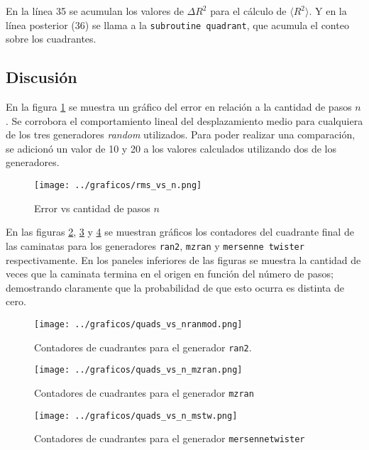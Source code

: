 \documentclass[a4paper,10pt]{paper}
\begin{document}
 En la l\'inea 35 se acumulan los valores de $\Delta R^2$ para el c\'alculo de $\langle R^2\rangle$.
 Y en la l\'inea posterior (36) se llama a la \texttt{subroutine quadrant}, que acumula el conteo sobre los
 cuadrantes.

\subsection{Discusi\'on}
En la figura \ref{fig:ej2} se muestra un gr\'afico del error en relaci\'on a la cantidad de
pasos $n$. Se corrobora el comportamiento lineal del desplazamiento medio para cualquiera de los
tres generadores \textit{random} utilizados. Para poder realizar una comparaci\'on, se adicion\'o
un valor de 10 y 20 a los valores calculados utilizando dos de los generadores.

\begin{figure}[H]
 \centering
 \texttt{[image: ../graficos/rms\_vs\_n.png]}
 \caption{Error vs cantidad de pasos $n$}
 \label{fig:ej2}
\end{figure}

En las figuras \ref{fig:ej2quadsranmod}, \ref{fig:ej2quadsmzran} y \ref{fig:ej2quadsmstw} se 
muestran gr\'aficos los contadores del cuadrante final de las caminatas para los generadores
\texttt{ran2}, \texttt{mzran} y \texttt{mersenne twister} respectivamente.
En los paneles inferiores de las figuras se muestra la cantidad de veces que la caminata termina
en el origen en funci\'on del n\'umero de pasos; demostrando claramente que la probabilidad
de que esto ocurra es distinta de cero. 

\begin{figure}[H]
 \centering
 \texttt{[image: ../graficos/quads\_vs\_nranmod.png]}
 \caption{Contadores de cuadrantes para el generador \texttt{ran2}.}
 \label{fig:ej2quadsranmod}
\end{figure}

\begin{figure}[H]
 \centering
 \texttt{[image: ../graficos/quads\_vs\_n\_mzran.png]}
 \caption{Contadores de cuadrantes para el generador \texttt{mzran}}
 \label{fig:ej2quadsmzran}
\end{figure}

\begin{figure}[H]
 \centering
 \texttt{[image: ../graficos/quads\_vs\_n\_mstw.png]}
 \caption{Contadores de cuadrantes para el generador \texttt{mersennetwister}}
 \label{fig:ej2quadsmstw}
\end{figure}
\end{document}
